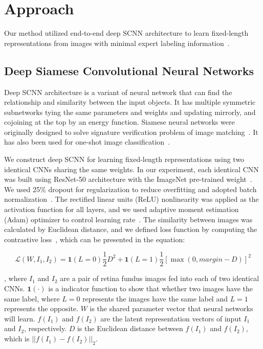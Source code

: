 \documentclass{article}
\begin{document}
\section{Approach}
Our method utilized end-to-end deep SCNN architecture to learn fixed-length representations from images with minimal expert labeling information~\citep{bromley1994signature}.

\subsection{Deep Siamese Convolutional Neural Networks}
Deep SCNN architecture is a variant of neural network that can find the relationship and similarity between the input objects. 
It has multiple symmetric subnetworks tying the same parameters and weights and updating mirrorly, and cojoining at the top by an energy function. 
Siamese neural networks were originally designed to solve signature verification problem of image matching~\citep{bromley1994signature}. 
It has also been used for one-shot image classification~\citep{koch2015siamese}.

We construct deep SCNN for learning fixed-length representations using two identical CNNs sharing the same weights. 
In our experiment, each identical CNN was built using ResNet-50 architecture with the ImageNet pre-trained weight~\citep{he2016deep}. 
We used 25\% dropout for regularization to reduce overfitting and adopted batch normalization~\citep{srivastava2014dropout,ioffe2015batch}. 
The rectified linear units (ReLU) nonlinearity was applied as the activation function for all layers, and we used adaptive moment estimation (Adam) optimizer to control learning rate~\citep{kingma2014adam}. 
The similarity between images was calculated by Euclidean distance, and we defined loss function by computing the contrastive loss~\citep{hadsell2006dimensionality}, which can be presented in the equation:

$$ \mathcal{L}(W, I_1, I_2) = \textbf{1}(L=0)\frac{1}{2}D^2 + \textbf{1}(L=1)\frac{1}{2}[\max (0, margin -D)]^2$$

, where $I_1$ and $I_2$ are a pair of retina fundus images fed into each of two identical CNNs. 
$\textbf{1}( \cdot )$ is a indicator function to show that whether two images have the same label, where $L=0$ represents the images have the same label and $L=1$ represents the opposite. 
$W$ is the shared parameter vector that neural networks will learn. 
$f(I_1)$ and $f(I_2)$ are the latent representation vectors of input $I_1$ and $I_2$, respectively. 
$D$ is the Euclidean distance between $f(I_1)$ and $f(I_2)$, which is $||f(I_1) - f(I_2)||_{2}$.
\end{document}
